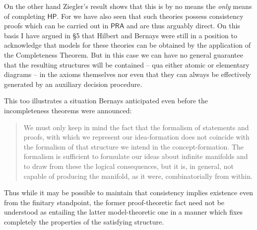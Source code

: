 \documentclass[11pt,fleqn,leqno]{article}
\begin{document}
On the other hand Ziegler's result shows that this is by no means the \textsl{only} means of completing $\mathsf{HP}$.   For we have also seen that such theories possess consistency proofs which can be carried out in $\mathsf{PRA}$ and are thus arguably direct.  On this basis I have argued in \S 5 that  Hilbert and Bernays were still in a position to acknowledge that  models for these theories can be obtained by the application of the Completeness Theorem.   But in this case we can have no general guarantee that the resulting structures will be contained -- qua either atomic or elementary diagrams --  in the axioms themselves nor even that they can always be effectively generated by an auxiliary decision procedure.  

This too illustrates a situation Bernays anticipated even before the incompleteness theorems were announced:
\begin{quote}
\footnotesize{We must only keep in mind the fact that the formalism of statements and proofs, with which we represent our idea-formation does not coincide with the formalism of that structure we intend in the
concept-formation.  The formalism is sufficient to formulate our ideas about infinite manifolds and to draw from these the logical consequences, but it is, in general, not capable of producing the manifold, as it were, combinatorially from within. \hfill \citeyearpar[p. 262]{Bernays1930}}
\end{quote}
Thus while it may be possible to maintain that consistency implies existence even from the finitary standpoint, the former proof-theoretic fact need not be understood as entailing the latter model-theoretic one in a manner which fixes completely the properties of the satisfying structure.


 


\renewcommand{\bibpreamble}{Note: In cases where an English translation is available, page references are to the  translation indicated below.}
\end{document}

